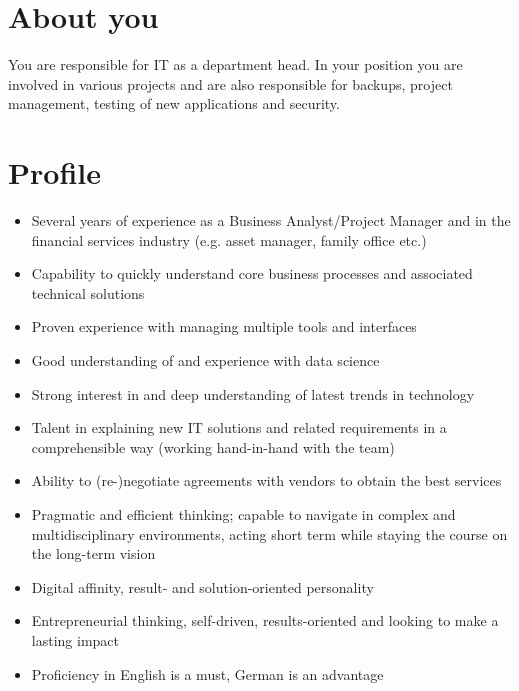 \section*{About you}
You are responsible for IT as a department head. 
In your position you are involved in various projects and are also responsible for backups, project management, testing of new applications and security.

\section*{Profile}
\begin{itemize}
    \item Several years of experience as a Business Analyst/Project Manager and in the financial services industry (e.g. asset manager, family office etc.)
    \item Capability to quickly understand core business processes and associated technical solutions
    \item Proven experience with managing multiple tools and interfaces
    \item Good understanding of and experience with data science
    \item Strong interest in and deep understanding of latest trends in technology
    \item Talent in explaining new IT solutions and related requirements in a comprehensible way (working hand-in-hand with the team)
    \item Ability to (re-)negotiate agreements with vendors to obtain the best services
    \item Pragmatic and efficient thinking; capable to navigate in complex and multidisciplinary environments, acting short term while staying the course on the long-term vision
    \item Digital affinity, result- and solution-oriented personality
    \item Entrepreneurial thinking, self-driven, results-oriented and looking to make a lasting impact
    \item Proficiency in English is a must, German is an advantage
\end{itemize}

